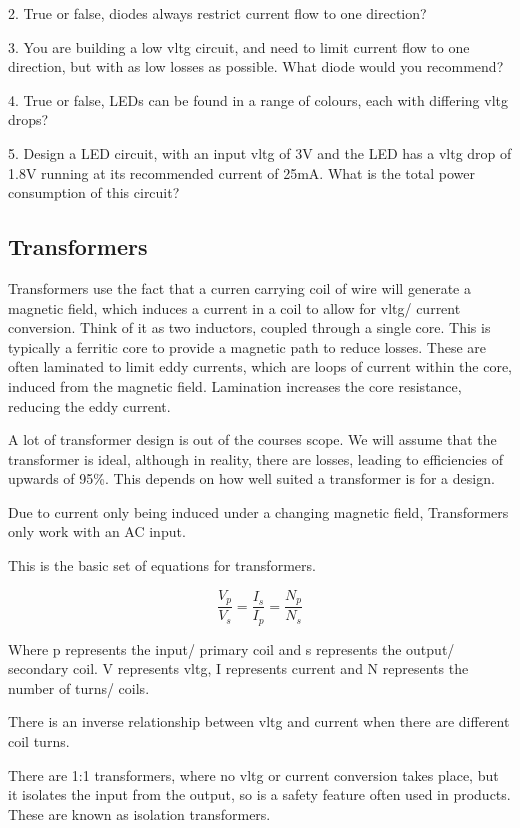 \documentclass[a4paper,11pt]{report}
\newcommand{\Theory}[1] %
{
\phantomsection %
\todo[inline, color=green!30]{\textbf{#1}} %
\vspace{1em} %
}
\begin{document}
2. True or false, diodes always restrict current flow to one direction?

3. You are building a low \gls{vltg} circuit, and need to limit current flow to one direction, but with as low losses as possible. What diode would you recommend?

4. True or false, LEDs can be found in a range of colours, each with differing \gls{vltg} drops?

5. Design a LED circuit, with an input \gls{vltg} of 3V and the LED has a \gls{vltg} drop of 1.8V running at its recommended current of 25mA. What is the total power consumption of this circuit?

\subsection{Transformers}

\Theory{What are Transformers?}

Transformers use the fact that a curren carrying coil of wire will generate a magnetic field, which induces a current in a coil to allow for \gls{vltg}/ current conversion. Think of it as two inductors, coupled through a single core. This is typically a ferritic core to provide a magnetic path to reduce losses. These are often laminated to limit eddy currents, which are loops of current within the core, induced from the magnetic field. Lamination increases the core resistance, reducing the eddy current.

A lot of transformer design is out of the courses scope. We will assume that the transformer is ideal, although in reality, there are losses, leading to efficiencies of upwards of 95\%. This depends on how well suited a transformer is for a design.

Due to current only being induced under a changing magnetic field, Transformers only work with an AC input.

This is the basic set of equations for transformers.

\[\frac{V_p}{V_s} = \frac{I_s}{I_p} = \frac{N_p}{N_s}\]

Where p represents the input/ primary coil and s represents the output/ secondary coil. V represents \gls{vltg}, I represents current and N represents the number of turns/ coils.

There is an inverse relationship between \gls{vltg} and current when there are different coil turns.

There are 1:1 transformers, where no \gls{vltg} or current conversion takes place, but it isolates the input from the output, so is a safety feature often used in products. These are known as isolation transformers.
\end{document}
